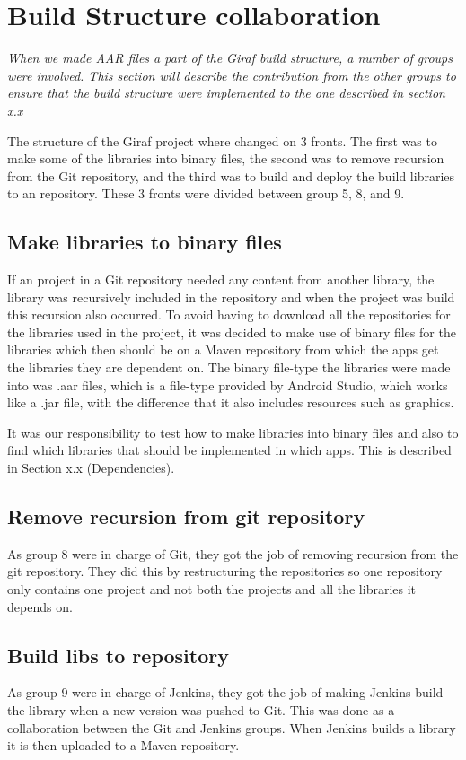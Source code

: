 \section{Build Structure collaboration}
\textit{When we made AAR files a part of the Giraf build structure, a number of groups were involved. This section will describe the contribution from the other groups to ensure that the build structure were implemented to the one described in section x.x}

The structure of the Giraf project where changed on 3 fronts. The first was to make some of the libraries into binary files, the second was to remove recursion from the Git repository, and the third was to build and deploy the build libraries to an repository. These 3 fronts were divided between group 5, 8, and 9. 

\subsection{Make libraries to binary files}
If an project in a Git repository needed any content from another library, the library was recursively included in the repository and when the project was build this recursion also occurred. To avoid having to download all the repositories for the libraries used in the project, it was decided to make use of binary files for the libraries which then should be on a Maven repository from which the apps get the libraries they are dependent on. The binary file-type the libraries were made into was .aar files, which is a file-type provided by Android Studio, which works like a .jar file, with the difference that it also includes resources such as graphics.

It was our responsibility to test how to make libraries into binary files and also to find which libraries that should be implemented in which apps. This is described in Section x.x (Dependencies).


\subsection{Remove recursion from git repository}
As group 8 were in charge of Git, they got the job of removing recursion from the git repository. They did this by restructuring the repositories so one repository only contains one project and not both the projects and all the libraries it depends on.

\subsection{Build libs to repository}
As group 9 were in charge of Jenkins, they got the job of making Jenkins build the library when a new version was pushed to Git. This was done as a collaboration between the Git and Jenkins groups. When Jenkins builds a library it is then uploaded to a Maven repository.

